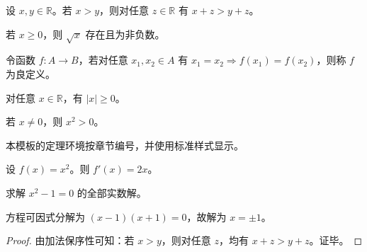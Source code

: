 \begin{theorem}
设 $x,y\in\mathbb{R}$。若 $x>y$，则对任意 $z\in\mathbb{R}$ 有 $x+z>y+z$。
\end{theorem}

\begin{lemma}
若 $x\ge 0$，则 $\sqrt{x}$ 存在且为非负数。
\end{lemma}

\begin{definition}
令函数 $f: A\to B$，若对任意 $x_1,x_2\in A$ 有 $x_1=x_2\Rightarrow f(x_1)=f(x_2)$，则称 $f$ 为良定义。
\end{definition}

\begin{proposition}
对任意 $x\in\mathbb{R}$，有 $|x|\ge 0$。
\end{proposition}

\begin{corollary}
若 $x\ne 0$，则 $x^2>0$。
\end{corollary}

\begin{remark}
本模板的定理环境按章节编号，并使用标准样式显示。
\end{remark}

\begin{example}
设 $f(x)=x^2$。则 $f'(x)=2x$。
\end{example}

\begin{problem}
求解 $x^2-1=0$ 的全部实数解。
\end{problem}

\begin{solution}
方程可因式分解为 $(x-1)(x+1)=0$，故解为 $x=\pm 1$。
\end{solution}

\begin{proof}
由加法保序性可知：若 $x>y$，则对任意 $z$，均有 $x+z>y+z$。证毕。
\end{proof}




